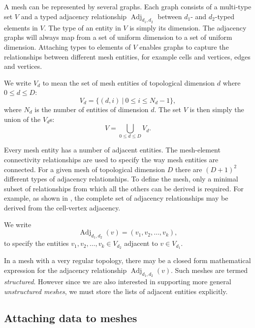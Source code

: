 \documentclass[11pt, a4paper]{scrartcl}
\DeclareMathOperator{\Adj}{Adj}
\begin{document}
A mesh can be represented by several graphs. Each graph consists of a
multi-type set $V$ and a typed adjacency relationship
$\Adj_{d_{1}, d_{2}}$ between $d_{1}$- and $d_{2}$-typed elements in
$V$. The type of an entity in $V$ is simply its dimension. The
adjacency graphs will always map from a set of uniform dimension to a
set of uniform dimension.  Attaching types to elements of $V$ enables
graphs to capture the relationships between different mesh entities,
for example cells and vertices, edges and vertices.

We write $V_{d}$ to mean the set of mesh entities of topological
dimension $d$ where $0 \leq d \leq D$:
\begin{equation}
V_{d}=\{ (d, i)\ |\ 0 \leq i \leq N_{d} - 1\},
\end{equation}
where $N_{d}$ is the number of entities of dimension $d$. The set $V$
is then simply the union of the $V_d$s:
\begin{equation}
V =\bigcup_{0 \leq d \leq D} V_{d}.
\end{equation}

Every mesh entity has a number of adjacent entities. The mesh-element
connectivity relationships are used to specify the way mesh entities
are connected. For a given mesh of topological dimension $D$ there are
$(D+1)^2$ different types of adjacency relationships. To define the
mesh, only a minimal subset of relationships from which all the others
can be derived is required.  For example, as shown in
\citet{Logg:2009}, the complete set of adjacency relationships may be
derived from the cell-vertex adjacency.

We write
\begin{equation}
 \Adj_{d_{1}, d_{2}}(v) = (v_{1}, v_{2}, \dots, v_{k}),
\end{equation}
to specify the entities $v_1, v_2, \dots, v_k \in V_{d_2}$ adjacent to
$v \in V_{d_1}$.

In a mesh with a very regular topology, there may be a closed form
mathematical expression for the adjacency relationship
$\Adj_{d_{1}, d_{2}}(v)$. Such meshes are termed
\emph{structured}. However since we are also interested in supporting
more general \emph{unstructured meshes}, we must store the lists of
adjacent entities explicitly.

\subsection{Attaching data to meshes}
\label{ssec:mesh-data}
\end{document}

